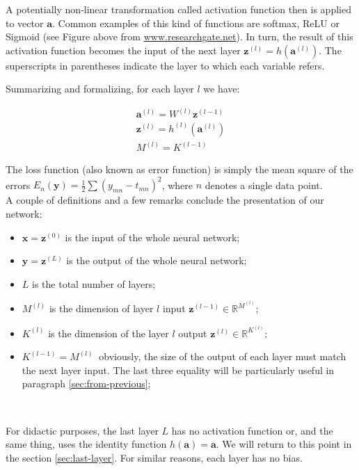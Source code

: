 \documentclass{article}
\begin{document}
A potentially non-linear transformation called activation function then is applied to vector $\displaystyle \mathbf{a}$. Common examples of this kind of functions are softmax, ReLU or Sigmoid  (see Figure above from  \url{www.researchgate.net}). In turn, the result of this activation function becomes the input of the next layer $\displaystyle \mathbf{z}^{( l)} =h(\mathbf{a}^{( l)})$. The superscripts in parentheses indicate the layer to which each variable refers. 

Summarizing and formalizing, for each layer $\displaystyle l$ we have:

\begin{gather*}
\mathbf{a}^{( l)} =W^{( l)}\mathbf{z}^{( l-1)}\\
\mathbf{z}^{( l)} =h^{( l)}\left(\mathbf{a}^{( l)}\right)\\
M^{( l)}=K^{( l-1)} \ 
\end{gather*}

The loss function (also known as error function) is simply the mean square of the errors $E_{n}(\mathbf{y}) =\frac{1}{2}\sum ( y_{mn} -t_{mn})^{2}$, where $n$ denotes a single data point.   \\

A couple of definitions and a few remarks conclude the presentation of our network: 
\begin{itemize}
    \item $\displaystyle \mathbf{x} =\mathbf{z}^{( 0)}$   is the input of the whole neural network;
    \item $\displaystyle \mathbf{y} =\mathbf{z}^{( L)}$  is the output of the whole neural network;
    \item $\displaystyle L$ is the total number of layers;
    \item $\displaystyle M^{( l)}$ is the dimension of layer $l$ input $\displaystyle \mathbf{z}^{( l-1)} \in \mathbb{R}^{M^{( l)}}$;
    \item $\displaystyle K^{( l)}$ is the dimension of the layer $l$ output $\displaystyle \mathbf{z}^{(l)} \in \mathbb{R}^{K^{( l)}}$;
    \item $ K^{( l-1)}=M^{(l)} \ $ obviously, the size of the output of each layer must match the next layer input. The last three equality will be particularly useful in paragraph \ref{sec:from-previous};
\end{itemize}
\ 
\begin{tcolorbox}[colback=gray!10, colframe=gray!50, title=Note]
For didactic purposes, the last layer $L$ has no activation function or, and the same thing, uses the identity function $h(\boldsymbol{a})=\boldsymbol{a}$. We will return to this point in the section \ref{sec:last-layer}.
For similar reasons, each layer has no bias.
\end{tcolorbox}
\end{document}
